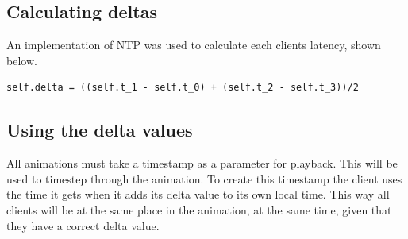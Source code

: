 \subsection{Calculating deltas}
An implementation of NTP was used to calculate each clients latency, shown below.

\begin{verbatim}
self.delta = ((self.t_1 - self.t_0) + (self.t_2 - self.t_3))/2
\end{verbatim}

\subsection {Using the delta values}

All animations must take a timestamp as a parameter for playback. This will be used to timestep through the animation. To create this timestamp the client uses the time it gets when it adds its delta value to its own local time. This way all clients will be at the same place in the animation, at the same time, given that they have a correct delta value. 


